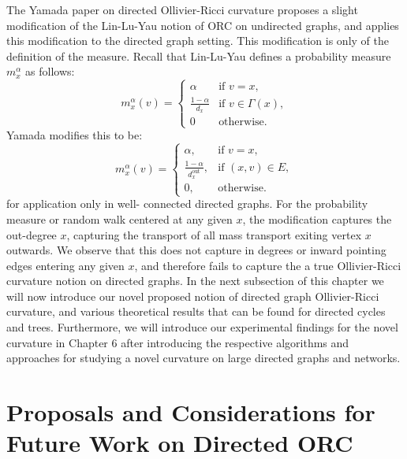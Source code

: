 \documentclass{Dissertate}
\theoremstyle{definition}
\theoremstyle{definition} %
\theoremstyle{definition}
\begin{document}
The Yamada paper on directed Ollivier-Ricci curvature \cite{yamada2016ricci} proposes a slight modification of the Lin-Lu-Yau notion of ORC on undirected graphs, and applies this modification to the directed graph setting. This modification is only of the definition of the measure. Recall that Lin-Lu-Yau defines a probability measure $m_x^\alpha$ as follows: 
$$
m_x^{\alpha}(v) = 
\begin{cases}
\alpha & \text{if } v = x, \\
\frac{1 - \alpha}{d_x} & \text{if } v \in \Gamma(x), \\
0 & \text{otherwise}.
\end{cases}
$$
Yamada modifies this to be:
$$
m_x^{\alpha}(v) = 
\begin{cases}
\alpha, & \text{if } v = x, \\
\frac{1 - \alpha}{d_x^{\text{out}}}, & \text{if } (x, v) \in E, \\
0, & \text{otherwise}.
\end{cases}
$$
for application only in well- connected directed graphs. For the probability measure or random walk centered at any given $x$, the modification captures the out-degree $x$, capturing the transport of all mass transport exiting vertex $x$ outwards. We observe that this does not capture in degrees or inward pointing edges entering any given $x$, and therefore fails to capture the a true Ollivier-Ricci curvature notion on directed graphs. In the next subsection of this chapter we will now introduce our novel proposed notion of directed graph Ollivier-Ricci curvature, and various theoretical results that can be found for directed cycles and trees. Furthermore, we will introduce our experimental findings for the novel curvature in Chapter 6 after introducing the respective algorithms and approaches for studying a novel curvature on large directed graphs and networks. 


\section*{Proposals and Considerations for Future Work on Directed ORC}
\end{document}
